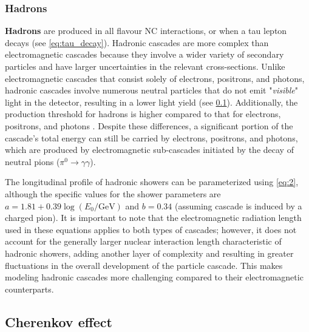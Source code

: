 \subsubsection{Hadrons}
\label{sec:hadrons_inice}
\textbf{Hadrons} are produced in all flavour NC interactions, or when a tau lepton decays (see \ref{eq:tau_decay}). Hadronic cascades are more complex than electromagnetic cascades because they involve a wider variety of secondary particles and have larger uncertainties in the relevant cross-sections. Unlike electromagnetic cascades that consist solely of electrons, positrons, and photons, hadronic cascades involve numerous neutral particles that do not emit "\emph{visible}" light in the detector, resulting in a lower light yield (see \ref{sec:cherenkov}). Additionally, the production threshold for hadrons is higher compared to that for electrons, positrons, and photons . Despite these differences, a significant portion of the cascade’s total energy can still be carried by electrons, positrons, and photons, which are produced by electromagnetic sub-cascades initiated by the decay of neutral pions ($\pi^0 \rightarrow \gamma\gamma$). 

The longitudinal profile of hadronic showers can be parameterized using \ref{eq:2}, although the specific values for the shower parameters are $a = 1.81 + 0.39 \log(E_0/\text{GeV})$ and $b = 0.34$ (assuming cascade is induced by a charged pion). It is important to note that the electromagnetic radiation length used in these equations applies to both types of cascades; however, it does not account for the generally larger nuclear interaction length characteristic of hadronic showers, adding another layer of complexity and resulting in greater fluctuations in the overall development of the particle cascade. This makes modeling hadronic cascades more challenging compared to their electromagnetic counterparts.

\subsection{Cherenkov effect}
\label{sec:cherenkov}

